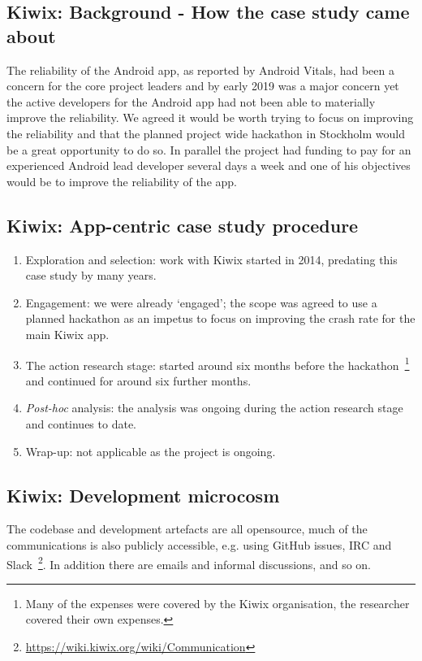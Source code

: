 \subsection{Kiwix: Background - How the case study came about}
The reliability of the Android app, as reported by Android Vitals, had been a concern for the core project leaders and by early 2019 was a major concern yet the active developers for the Android app had not been able to materially improve the reliability. We agreed it would be worth trying to focus on improving the reliability and that the planned project wide hackathon in Stockholm would be a great opportunity to do so. In parallel the project had funding to pay for an experienced Android lead developer several days a week and one of his objectives would be to improve the reliability of the app. 


\subsection{Kiwix: App-centric case study procedure}
{\small
\begin{enumerate}
    \itemsep0em
    \item Exploration and selection: work with Kiwix started in 2014, predating this case study by many years. 
    \item Engagement: we were already `engaged'; the scope was agreed to use a planned hackathon as an impetus to focus on improving the crash rate for the main Kiwix app.
    \item The action research stage: started around six months before the hackathon~\footnote{Many of the expenses were covered by the Kiwix organisation, the researcher covered their own expenses.} and continued for around six further months.
    \item \textit{Post-hoc} analysis: the analysis was ongoing during the action research stage and continues to date.
    \item Wrap-up: not applicable as the project is ongoing.
\end{enumerate}
}


\subsection{Kiwix: Development microcosm}
The codebase and development artefacts are all opensource, much of the communications is also publicly accessible, e.g. using GitHub issues, IRC and Slack~\footnote{\url{https://wiki.kiwix.org/wiki/Communication}}. In addition there are emails and informal discussions, and so on.

